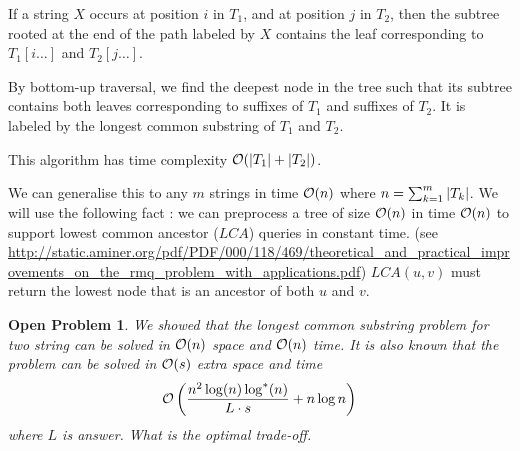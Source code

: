 \documentclass{cours}
\newtheorem{openpb}{Open Problem}
\begin{document}
\begin{remark}
    If a string $X$ occurs at position $i$ in $T_{1}$, and at position $j$ in $T_{2}$, then the subtree rooted at the end of the path labeled by $X$ contains the leaf corresponding to $T_{1}[i\ldots]$ and $T_{2}[j \ldots]$.
\end{remark}

By bottom-up traversal, we find the deepest node in the tree such that its subtree contains both leaves corresponding to suffixes of $T_{1}$ and suffixes of $T_{2}$. It is labeled by the longest common substring of $T_{1}$ and $T_{2}$.
\begin{proposition}
    This algorithm has time complexity $\mathcal{O}(\left|T_{1}\right| + \left|T_{2}\right|)$.
\end{proposition}

We can generalise this to any $m$ strings in time $\mathcal{O}(n)$ where $n = \sum_{k = 1}^{m} \left|T_{k}\right|$. We will use the following fact : we can preprocess a tree of size $\mathcal{O}(n)$ in time $\mathcal{O}(n)$ to support lowest common ancestor ($LCA$) queries in constant time. (see \href{this}{http://static.aminer.org/pdf/PDF/000/118/469/theoretical_and_practical_improvements_on_the_rmq_problem_with_applications.pdf}) $LCA(u, v)$ must return the lowest node that is an ancestor of both $u$ and $v$.

\begin{openpb}
    We showed that the longest common substring problem for two string can be solved in $\mathcal{O}(n)$ space and $\mathcal{O}(n)$ time. It is also known that the problem can be solved in $\mathcal{O}(s)$ extra space and time 
    \[
        \mathcal{O}\left(\frac{n^{2}\log(n)\log^{*}(n)}{L\cdot s} + n \log n\right)
    \]
    where $L$ is answer.
    What is the optimal trade-off.
\end{openpb}
\end{document}
